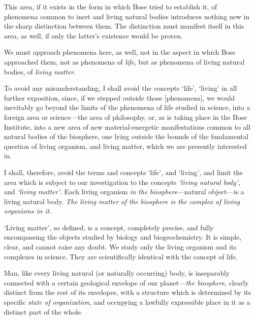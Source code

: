 This area, if it exists in the form in which Bose tried to establish it, of
phenomena common to inert and living natural bodies introduces nothing new in
the sharp distinction between them.  The distinction must manifest itself in
this area, as well, if only the latter's existence would be proven.

We must approach phenomena here, as well, not in the aspect in which Bose
approached them, not as phenomena of \emph{life}, but as phenomena of living
natural bodies, of \emph{living matter}.

To avoid any misunderstanding, I shall avoid the concepts `life', `living' in
all further exposition, since, if we stepped outside those
[phenomena], we would inevitably
go beyond the limits of the phenomena of life studied in science, into a
foreign area or science---the area of philosophy, or, as is taking place in the
Bose Institute, into a new area of new material-energetic manifestations common
to all natural bodies of the biosphere, one lying outside the bounds of the
fundamental question of living organism, and living matter, which we are
presently interested in.

I shall, therefore, avoid the terms and concepts `life', and `living', and
limit the area which is subject to our investigation to the concepts
\emph{`living natural body'}, and \emph{`living matter'}.  Each living organism
\emph{in the biosphere}---natural object---is a living natural body.  \emph{The
living matter of the biosphere is the complex of living organisms in it.}

`Living matter', so defined, is a concept, completely precise, and fully
encompassing the objects studied by biology and biogeochemistry.  It is simple,
clear, and cannot raise any doubt.  We study only the living organism and its
complexes in science.  They are scientifically identical with the concept of
life.


\Section %
Man, like every living natural (or naturally occurring) body, is inseparably connected with a certain geological
envelope of our planet---\emph{the biosphere}, clearly distinct from the rest
of its envelopes, with a structure which is determined by its specific
\emph{state of organization}, and occupying a
lawfully expressible place in it as a distinct part of the whole.

